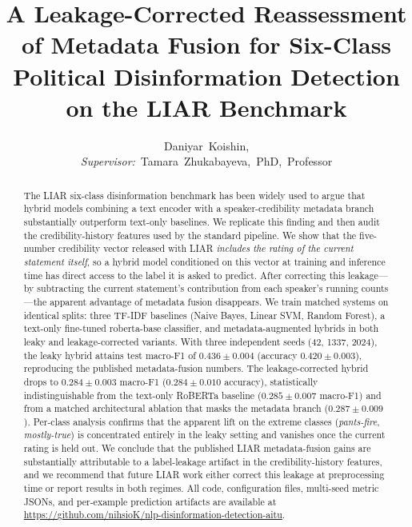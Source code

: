 \documentclass[journal]{IEEEtran}
\begin{document}
\title{A Leakage-Corrected Reassessment of Metadata Fusion for Six-Class Political Disinformation Detection on the LIAR Benchmark}

\author{%
  Daniyar~Koishin,%
  \\%
  \textit{Supervisor:}~Tamara~Zhukabayeva,~PhD,~Professor%
}


\maketitle

\begin{abstract}
The LIAR six-class disinformation benchmark has been widely used to argue that hybrid models combining a text encoder with a speaker-credibility metadata branch substantially outperform text-only baselines. We replicate this finding and then audit the credibility-history features used by the standard pipeline. We show that the five-number credibility vector released with LIAR \emph{includes the rating of the current statement itself}, so a hybrid model conditioned on this vector at training and inference time has direct access to the label it is asked to predict. After correcting this leakage---by subtracting the current statement's contribution from each speaker's running counts---the apparent advantage of metadata fusion disappears. We train matched systems on identical splits: three TF-IDF baselines (Naive Bayes, Linear SVM, Random Forest), a text-only fine-tuned roberta-base classifier, and metadata-augmented hybrids in both leaky and leakage-corrected variants. With three independent seeds (42, 1337, 2024), the leaky hybrid attains test macro-F1 of $0.436 \pm 0.004$ (accuracy $0.420 \pm 0.003$), reproducing the published metadata-fusion numbers. The leakage-corrected hybrid drops to $0.284 \pm 0.003$ macro-F1 ($0.284 \pm 0.010$ accuracy), statistically indistinguishable from the text-only RoBERTa baseline ($0.285 \pm 0.007$ macro-F1) and from a matched architectural ablation that masks the metadata branch ($0.287 \pm 0.009$). Per-class analysis confirms that the apparent lift on the extreme classes (\emph{pants-fire}, \emph{mostly-true}) is concentrated entirely in the leaky setting and vanishes once the current rating is held out. We conclude that the published LIAR metadata-fusion gains are substantially attributable to a label-leakage artifact in the credibility-history features, and we recommend that future LIAR work either correct this leakage at preprocessing time or report results in both regimes. All code, configuration files, multi-seed metric JSONs, and per-example prediction artifacts are available at \url{https://github.com/nihsioK/nlp-disinformation-detection-aitu}.
\end{abstract}
\end{document}
